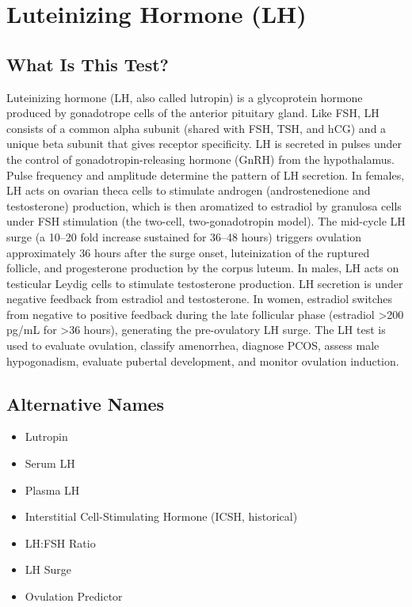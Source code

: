 \chapter{Luteinizing Hormone (LH)}

\section*{What Is This Test?}
Luteinizing hormone (LH, also called lutropin) is a glycoprotein hormone produced by gonadotrope cells of the anterior pituitary gland. Like FSH, LH consists of a common alpha subunit (shared with FSH, TSH, and hCG) and a unique beta subunit that gives receptor specificity. LH is secreted in pulses under the control of gonadotropin-releasing hormone (GnRH) from the hypothalamus. Pulse frequency and amplitude determine the pattern of LH secretion. In females, LH acts on ovarian theca cells to stimulate androgen (androstenedione and testosterone) production, which is then aromatized to estradiol by granulosa cells under FSH stimulation (the two-cell, two-gonadotropin model). The mid-cycle LH surge (a 10--20 fold increase sustained for 36--48 hours) triggers ovulation approximately 36 hours after the surge onset, luteinization of the ruptured follicle, and progesterone production by the corpus luteum. In males, LH acts on testicular Leydig cells to stimulate testosterone production. LH secretion is under negative feedback from estradiol and testosterone. In women, estradiol switches from negative to positive feedback during the late follicular phase (estradiol >200 pg/mL for >36 hours), generating the pre-ovulatory LH surge. The LH test is used to evaluate ovulation, classify amenorrhea, diagnose PCOS, assess male hypogonadism, evaluate pubertal development, and monitor ovulation induction.

\section*{Alternative Names}
\begin{itemize}
  \item Lutropin
  \item Serum LH
  \item Plasma LH
  \item Interstitial Cell-Stimulating Hormone (ICSH, historical)
  \item LH:FSH Ratio
  \item LH Surge
  \item Ovulation Predictor
\end{itemize}
